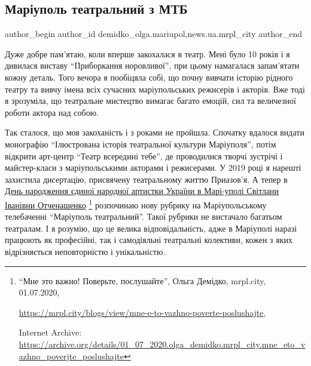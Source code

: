  
 
 
 
 
 
\subsection{Маріуполь театральний з МТБ}
\label{sec:07_07_2020.stz.news.ua.mrpl_city.1.mrpl_teatralnyj_z_mtb}
 
\ifcmt
 author_begin
   author_id demidko_olga.mariupol,news.ua.mrpl_city
 author_end
\fi

Дуже добре пам'ятаю, коли вперше закохалася в театр. Мені було 10 років і я
дивилася виставу \enquote{Приборкання норовливої}, при цьому  намагалася запам'ятати
кожну деталь. Того вечора я пообіцяла собі, що почну вивчати історію рідного
театру та вивчу імена всіх сучасних маріупольських режисерів і акторів. Вже
тоді я зрозуміла, що театральне мистецтво вимагає багато емоцій, сил та
величезної роботи актора над собою. 

Так сталося, що моя закоханість і з роками не пройшла. Спочатку вдалося видати
монографію \enquote{Ілюстрована історія театральної культури Маріуполя}, потім відкрити
арт-центр \enquote{Театр всередині тебе}, де проводилися творчі зустрічі і
майстер-класи з маріупольськими акторами і режисерами. У  2019 році я нарешті
захистила дисертацію, присвячену театральному життю Приазов'я. А тепер в \href{https://archive.org/details/01_07_2020.olga_demidko.mrpl_city.mne_eto_vazhno_poverjte_poslushajte}{День
народження єдиної  народної артистки України в Марі\hyp{}уполі Світлани Іванівни
Отченашенко}%
\footnote{\enquote{Мне это важно! Поверьте, послушайте}, Ольга Демідко, mrpl.city, 01.07.2020, \par%
\url{https://mrpl.city/blogs/view/mne-e-to-vazhno-poverte-poslushajte}, \par%
Internet Archive: \url{https://archive.org/details/01_07_2020.olga_demidko.mrpl_city.mne_eto_vazhno_poverjte_poslushajte}
}
розпочинаю нову рубрику на Маріупольському телебаченні \enquote{Маріуполь
театральний}. Такої рубрики не вистачало багатьом театралам.  І я розумію, що
це велика відповідальність, адже в Маріуполі наразі працюють як професійні, так
і самодіяльні театральні колективи, кожен з яких відрізняється неповторністю  і
унікальністю.

